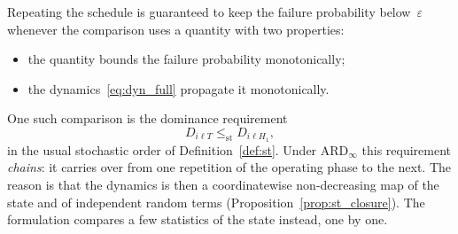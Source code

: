 \documentclass[11pt,a4paper]{article}
\theoremstyle{plain}
\theoremstyle{definition}
\theoremstyle{remark}
\begin{document}
Repeating the schedule is guaranteed to keep the failure probability below~$\varepsilon$ whenever the comparison uses a quantity with two properties:
\begin{itemize}
  \item the quantity bounds the failure probability monotonically;
  \item the dynamics~\eqref{eq:dyn_full} propagate it monotonically.
\end{itemize}
One such comparison is the dominance requirement
\begin{equation}
  D_{i\ell T} \le_{\mathrm{st}} D_{i\ell H_1},
\end{equation}
in the usual stochastic order of Definition~\ref{def:st}.
Under $\text{ARD}_\infty$ this requirement \emph{chains}: it carries over from one repetition of the operating phase to the next.
The reason is that the dynamics is then a coordinatewise non-decreasing map of the state and of independent random terms (Proposition~\ref{prop:st_closure}).
The formulation compares a few statistics of the state instead, one by one.
\end{document}
